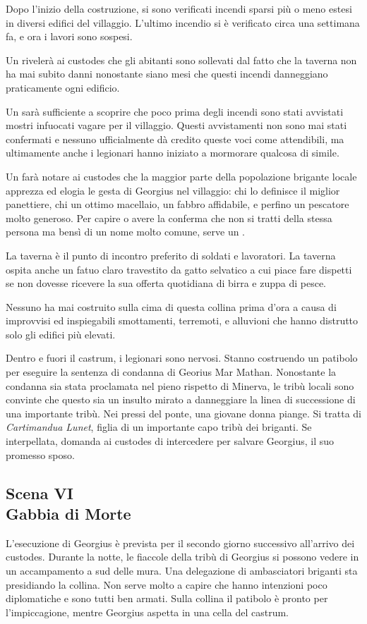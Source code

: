 \documentclass[11.5pt,twocolumn]{article}
\begin{document}
Dopo l'inizio della costruzione, si sono verificati incendi sparsi pi\`{u} o meno estesi in diversi edifici del villaggio.
L'ultimo incendio si \`{e} verificato circa una settimana fa, e ora i lavori sono sospesi.

Un  riveler\`{a} ai custodes che gli abitanti sono sollevati dal fatto che la taverna non ha mai subito danni nonostante siano mesi che questi incendi danneggiano praticamente ogni edificio.

Un  sar\`{a} sufficiente a scoprire che poco prima degli incendi sono stati avvistati mostri infuocati vagare per il villaggio.
Questi avvistamenti non sono mai stati confermati e nessuno ufficialmente d\`{a} credito queste voci come attendibili, ma ultimamente anche i legionari hanno iniziato a mormorare qualcosa di simile.

Un  far\`{a} notare ai custodes che la maggior parte della popolazione brigante locale apprezza ed elogia le gesta di Georgius nel villaggio: chi lo definisce il miglior panettiere, chi un ottimo macellaio, un fabbro affidabile, e perfino un pescatore molto generoso. Per capire o avere la conferma che non si tratti della stessa persona ma bens\`{i} di un nome molto comune, serve un .

La taverna \`{e} il punto di incontro preferito di soldati e lavoratori. La taverna ospita anche un fatuo claro travestito da gatto selvatico a cui piace fare dispetti se non dovesse ricevere la sua offerta quotidiana di birra e zuppa di pesce.

Nessuno ha mai costruito sulla cima di questa collina prima d'ora a causa di improvvisi ed inspiegabili smottamenti, terremoti, e alluvioni che hanno distrutto solo gli edifici pi\`{u} elevati.

Dentro e fuori il castrum, i legionari sono nervosi.
Stanno costruendo un patibolo per eseguire la sentenza di condanna di Georius Mar Mathan.
Nonostante la condanna sia stata proclamata nel pieno rispetto di Minerva, le trib\`{u} locali sono convinte che questo sia un insulto mirato a danneggiare la linea di successione di una importante trib\`{u}.
Nei pressi del ponte, una giovane donna piange.
Si tratta di \emph{Cartimandua Lunet}, figlia di un importante capo trib\`{u} dei briganti.
Se interpellata, domanda ai custodes di intercedere per salvare Georgius, il suo promesso sposo.

\subsection*{Scena VI\\Gabbia di Morte}
%
L'esecuzione di Georgius \`{e} prevista per il secondo giorno successivo all'arrivo dei custodes.
Durante la notte, le fiaccole della trib\`{u} di Georgius si possono vedere in un accampamento a sud delle mura.
Una delegazione di ambasciatori briganti sta presidiando la collina.
Non serve molto a capire che hanno intenzioni poco diplomatiche e sono tutti ben armati.
%
Sulla collina il patibolo \`{e} pronto per l'impiccagione, mentre Georgius aspetta in una cella del castrum.
\end{document}
